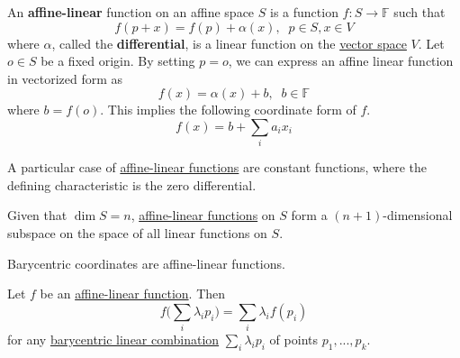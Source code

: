   \begin{definition}
    \label{def:affine-linear-function}
    An \textbf{affine-linear} function on an affine space $S$ is a function $f: S \to \mathbb{F}$ such that
    \begin{equation}
      f(p + x) = f(p) + \alpha (x), \;\; p \in S , x \in V
    \end{equation}
    where $\alpha$, called the \textbf{differential}, is a linear function on the \hyperref[def:vector-space]{vector space} $V$. Let $o \in S$ be a fixed origin. By setting $p = o$, we can express an affine linear function in vectorized form as 
    \begin{equation}
      f(x) = \alpha (x) + b, \;\; b \in \mathbb{F}
    \end{equation}
    where $b = f(o)$. This implies the following coordinate form of $f$. 
    \begin{equation}
      f(x) = b + \sum_i a_i x_i
    \end{equation}
  \end{definition}

  A particular case of \hyperref[def:affine-linear-function]{affine-linear functions} are constant functions, where the defining characteristic is the zero differential. 

  \begin{theorem}
    \label{thm:dimension-of-the-space-of-affine-linear}
    Given that $\dim{S} = n$, \hyperref[def:affine-linear-function]{affine-linear functions} on $S$ form a $(n+1)$-dimensional subspace on the space of all linear functions on $S$. 
  \end{theorem}

  \begin{theorem}
    \label{thm:barycentric-coordinates-are-affine-linear}
    Barycentric coordinates are affine-linear functions. 
  \end{theorem}

  \begin{theorem}
    \label{thm:affine-linear-functions-on-barycentric}
    Let $f$ be an \hyperref[def:affine-linear-function]{affine-linear function}. Then
    \begin{equation}
      f \bigg( \sum_i \lambda_i p_i \bigg) = \sum_i \lambda_i f(p_i)
    \end{equation}
    for any \hyperref[def:barycentric-linear-combination]{barycentric linear combination} $\sum_i \lambda_i p_i$ of points $p_1, ..., p_k$. 
  \end{theorem}

